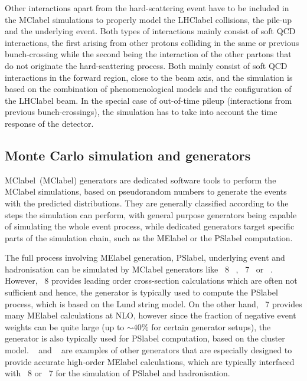 Other interactions apart from the hard-scattering event have to be included in the \acrshort{MClabel} simulations to properly model the \acrshort{LHClabel} collisions, the pile-up and the underlying event. Both types of interactions mainly consist of soft \acrshort{QCD} interactions, the first arising from other protons colliding in the same or previous bunch-crossing while the second being the interaction of the other partons that do not originate the hard-scattering process. Both mainly consist of soft \acrshort{QCD} interactions in the forward region, close to the beam axis, and the simulation is based on the combination of phenomenological models and the configuration of the \acrshort{LHClabel} beam. In the special case of out-of-time pileup (interactions from previous bunch-crossings), the simulation has to take into account the time response of the detector.

\subsection{Monte Carlo simulation and generators}
\label{subsec:MCsimulation}
\acrlong{MClabel}~(\acrshort{MClabel}) generators are dedicated software tools to perform the \acrshort{MClabel} simulations, based on pseudorandom numbers to generate the events with the predicted distributions. They are generally classified according to the steps the simulation can perform, with general purpose generators being capable of simulating the whole event process, while dedicated generators target specific parts of the simulation chain, such as the \acrshort{MElabel} or the \acrshort{PSlabel} computation.

The full process involving \acrshort{MElabel} generation, \acrshort{PSlabel}, underlying event and hadronisation can be simulated by \acrshort{MClabel} generators like \PYTHIA~8~\cite{SJOSTRAND2015159}
, \HERWIG~7~\cite{Bahr2008,Bellm2016}
or \SHERPA~\cite{10.21468SciPostPhys.7.3.034}. However, \PYTHIA~8 provides leading order cross-section calculations which are often not sufficient and hence, the generator is typically used to compute the \acrshort{PSlabel} process, which is based on the Lund string model. On the other hand, \HERWIG~7 provides many \acrshort{MElabel} calculations at NLO, however since the fraction of negative event weights can be quite large (up to $\sim40\%$ for certain generator setups), the generator is also typically used for \acrshort{PSlabel} computation, based on the cluster model. \POWHEGBOX~\cite{Nason_2004,Frixione_2007,Alioli2010,PhysRevD.91.094003,Frixione_20072}
and \MGMCatNLO~\cite{Alwall_2007}
are examples of other generators that are especially designed to provide accurate high-order \acrshort{MElabel} calculations, which are typically interfaced with \PYTHIA~8 or \HERWIG~7 for the simulation of \acrshort{PSlabel} and hadronisation. 

